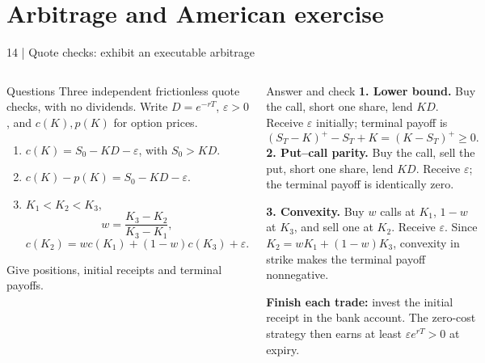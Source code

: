 \documentclass[handout,10pt,t,aspectratio=169]{beamer}
\newenvironment{questions}{\begin{block}{Questions}}{\end{block}}
\newenvironment{answers}{\begin{exampleblock}{Answer and check}}{\end{exampleblock}}
\newcommand{\compact}{\small%
 \setlength{\abovedisplayskip}{3pt}%
 \setlength{\belowdisplayskip}{3pt}%
 \setlength{\abovedisplayshortskip}{2pt}%
 \setlength{\belowdisplayshortskip}{2pt}%
 \setlength{\parskip}{2pt}}
\begin{document}
\section{Arbitrage and American exercise}
\begin{frame}{14 | Quote checks: exhibit an executable arbitrage}
\compact
\begin{columns}[T,onlytextwidth]
\begin{questions}
Three independent frictionless quote checks, with no dividends.
Write \(D=e^{-rT}\), \(\varepsilon>0\), and \(c(K),p(K)\) for option prices.
\begin{enumerate}
\item \(c(K)=S_0-KD-\varepsilon\), with \(S_0>KD\).
\item \(c(K)-p(K)=S_0-KD-\varepsilon\).
\item \(K_1<K_2<K_3\),
\[
 w=\frac{K_3-K_2}{K_3-K_1},
\]
\[
 c(K_2)=wc(K_1)+(1-w)c(K_3)+\varepsilon.
\]
\end{enumerate}
Give positions, initial receipts and terminal payoffs.
\end{questions}
\begin{answers}
\textbf{1. Lower bound.} Buy the call, short one share, lend \(KD\).
Receive \(\varepsilon\) initially; terminal payoff is
\[
 (S_T-K)^+-S_T+K=(K-S_T)^+\geq0.
\]
\textbf{2. Put--call parity.} Buy the call, sell the put, short one share,
lend \(KD\). Receive \(\varepsilon\); the terminal payoff is identically zero.

\textbf{3. Convexity.} Buy \(w\) calls at \(K_1\), \(1-w\) at \(K_3\),
and sell one at \(K_2\). Receive \(\varepsilon\).
Since \(K_2=wK_1+(1-w)K_3\), convexity in strike makes the terminal payoff nonnegative.

\textbf{Finish each trade:} invest the initial receipt in the bank account.
The zero-cost strategy then earns at least \(\varepsilon e^{rT}>0\) at expiry.
\end{answers}
\end{columns}
\end{frame}
\end{document}
